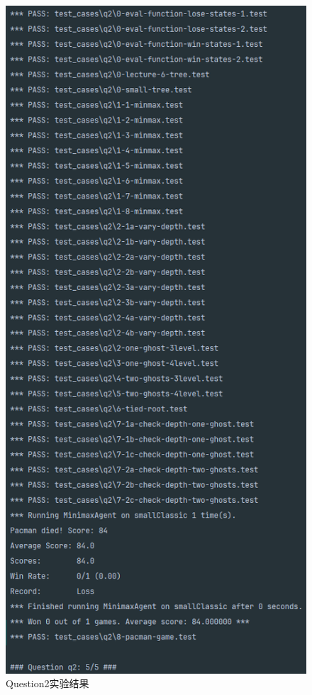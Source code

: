 \begin{figure}[H]
    \centering
    \includegraphics[scale = 0.8]{pic/q2.png}
    \caption{Question2实验结果}\label{q2}
\end{figure}
%
%
%
%
%
